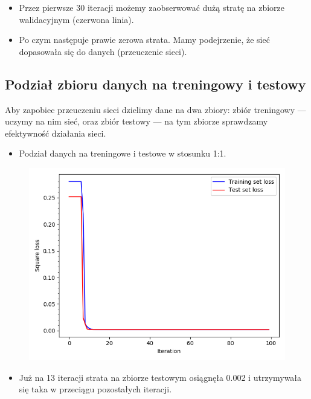 \documentclass[12pt,a4paper]{article}
\begin{document}
\begin{itemize}
	\item 	Przez pierwsze 30 iteracji możemy zaobserwować dużą stratę na zbiorze walidacyjnym (czerwona linia).
  \item	Po czym następuje prawie zerowa strata. Mamy podejrzenie, że sieć dopasowała się do danych (przeuczenie sieci).
\end{itemize}

\pagebreak

\subsection{Podział zbioru danych na treningowy i testowy}
Aby zapobiec przeuczeniu sieci dzielimy dane na dwa zbiory: zbiór treningowy --- uczymy na nim sieć, oraz zbiór testowy --- na tym zbiorze sprawdzamy efektywność działania sieci.

\begin{itemize}
  \item   Podział danych na treningowe i testowe w stosunku 1:1.
\end{itemize}

\begin{figure}[h]
  \centering
  \includegraphics[width=1.0\textwidth]{charts/double_activation/simple_validation_2neurons.png}
  \caption{}
  \label{}
\end{figure}

\begin{itemize}
  \item   Już na 13 iteracji strata na zbiorze testowym osiągnęła 0.002 i utrzymywała się taka w przeciągu pozostałych iteracji.
\end{itemize}
\end{document}
